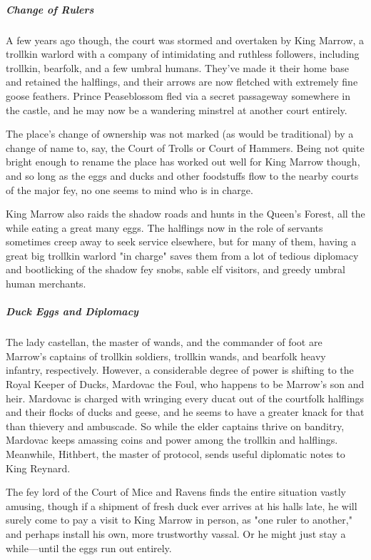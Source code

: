 \documentclass[10pt,a4paper,twoside,bg=print,twocolumn,openany,nodeprecatedcode]{dndbook}
\begin{document}
\subparagraph{Change of Rulers}
A few years ago though, the court was stormed and overtaken by King Marrow, a trollkin warlord with a company of intimidating and ruthless followers, including trollkin, bearfolk, and a few umbral humans. They've made it their home base and retained the halflings, and their arrows are now fletched with extremely fine goose feathers. Prince Peaseblossom fled via a secret passageway somewhere in the castle, and he may now be a wandering minstrel at another court entirely.

The place's change of ownership was not marked (as would be traditional) by a change of name to, say, the Court of Trolls or Court of Hammers. Being not quite bright enough to rename the place has worked out well for King Marrow though, and so long as the eggs and ducks and other foodstuffs flow to the nearby courts of the major fey, no one seems to mind who is in charge.

King Marrow also raids the shadow roads and hunts in the Queen's Forest, all the while eating a great many eggs. The halflings now in the role of servants sometimes creep away to seek service elsewhere, but for many of them, having a great big trollkin warlord "in charge" saves them from a lot of tedious diplomacy and bootlicking of the shadow fey snobs, sable elf visitors, and greedy umbral human merchants.

\subparagraph{Duck Eggs and Diplomacy}
The lady castellan, the master of wands, and the commander of foot are Marrow's captains of trollkin soldiers, trollkin wands, and bearfolk heavy infantry, respectively. However, a considerable degree of power is shifting to the Royal Keeper of Ducks, Mardovac the Foul, who happens to be Marrow's son and heir. Mardovac is charged with wringing every ducat out of the courtfolk halflings and their flocks of ducks and geese, and he seems to have a greater knack for that than thievery and ambuscade. So while the elder captains thrive on banditry, Mardovac keeps amassing coins and power among the trollkin and halflings. Meanwhile, Hithbert, the master of protocol, sends useful diplomatic notes to King Reynard.

The fey lord of the Court of Mice and Ravens finds the entire situation vastly amusing, though if a shipment of fresh duck ever arrives at his halls late, he will surely come to pay a visit to King Marrow in person, as "one ruler to another," and perhaps install his own, more trustworthy vassal. Or he might just stay a while—until the eggs run out entirely.
\end{document}
